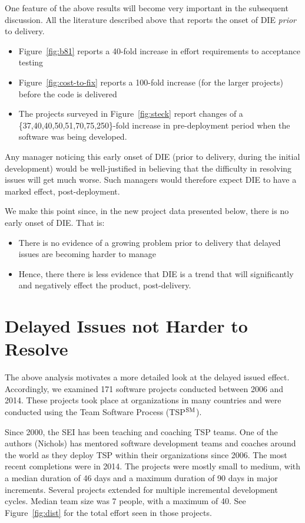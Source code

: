 \documentclass[smallcondesed]{svjour3}
\newcommand{\bi}{\begin{itemize}}%
\newcommand{\ei}{\end{itemize}}
\newcommand{\fig}[1]{Figure~\ref{fig:#1}}
\begin{document}
\label{sect:earlyonset}

One feature of the above results will become very important in the subsequent discussion.  
All the   literature described above that reports the onset of  DIE  {\em prior} to delivery.
\bi
\item  
\fig{b81} reports a 40-fold increase in effort requirements to acceptance testing
\item
 \fig{cost-to-fix} reports a 100-fold increase
(for the larger projects) before the code is delivered 
\item
The projects surveyed in \fig{steck} report changes of a  
\{37,40,40,50,51,70,75,250\}-fold increase in pre-deployment period when the software was being developed.
\ei
Any manager noticing this  early onset of DIE (prior to delivery, during the initial development)
would be well-justified
in believing that  the difficulty in resolving issues  will get much worse. Such managers
would therefore expect DIE to have a marked effect, post-deployment.

We make this point since,  in the new project data presented below, there is no early onset of DIE. 
That is:
\bi
\item There is no evidence of a growing problem prior to delivery that delayed issues are becoming harder to manage
\item  Hence, there there is less evidence that DIE is a trend that will significantly and negatively effect the product,
post-delivery.
\ei


 

\section{Delayed Issues not  Harder  to Resolve}

The above analysis motivates a more detailed look at the delayed issued effect.  
Accordingly, we examined 171 software projects conducted between 2006 and 2014. These projects took place at organizations in many countries and were conducted using  the Team Software Process (TSP$\textsuperscript{SM}$).

Since 2000, the SEI has been teaching and coaching TSP teams. One of the authors (Nichols) has mentored software development teams and coaches around the world as they deploy TSP within their organizations since 2006.  The  most recent completions were in 2014.
The projects were mostly small to medium, with a median duration of 46 days and a maximum duration of 90 days in major increments. 
Several projects extended for multiple incremental development cycles. 
Median team size was 7 people, with a maximum of 40. See \fig{dist} for the total
effort seen in those projects.
\end{document}
